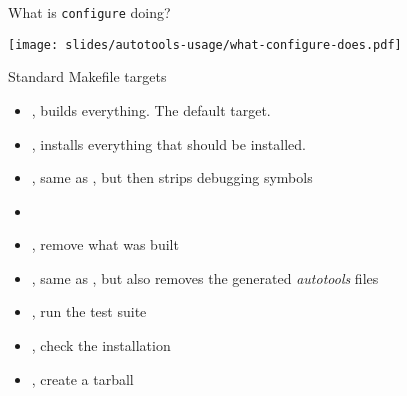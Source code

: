 \begin{frame}{What is {\tt configure} doing?}
  \begin{center}
    \texttt{[image: slides/autotools-usage/what-configure-does.pdf]}
  \end{center}
\end{frame}

\begin{frame}{Standard Makefile targets}
  \begin{itemize}
  \item {}, builds everything. The default target.
  \item {}, installs everything that should be installed.
  \item {}, same as , but then strips
    debugging symbols
  \item {}
  \item {}, remove what was built
  \item {}, same as , but also removes the
    generated {\em autotools} files
  \item {}, run the test suite
  \item {}, check the installation
  \item {}, create a tarball
  \end{itemize}
\end{frame}

